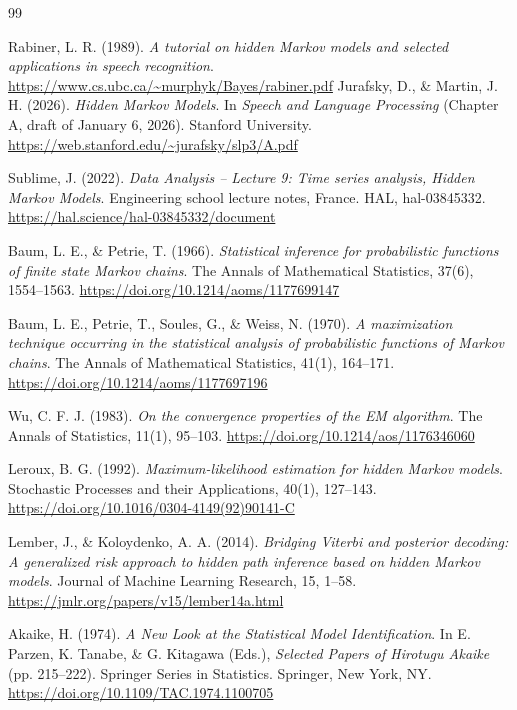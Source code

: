 \documentclass[11pt]{article}
\begin{document}
\begin{thebibliography}{99}

Rabiner, L. R. (1989).
\emph{A tutorial on hidden Markov models and selected applications in speech recognition}.
\url{https://www.cs.ubc.ca/~murphyk/Bayes/rabiner.pdf}
Jurafsky, D., \& Martin, J. H. (2026).
\emph{Hidden Markov Models}.
In \emph{Speech and Language Processing} (Chapter A, draft of January 6, 2026).
Stanford University.
\url{https://web.stanford.edu/~jurafsky/slp3/A.pdf}

Sublime, J. (2022).
\emph{Data Analysis -- Lecture 9: Time series analysis, Hidden Markov Models}.
Engineering school lecture notes, France.
HAL, hal-03845332.
\url{https://hal.science/hal-03845332/document}

Baum, L. E., \& Petrie, T. (1966).
\emph{Statistical inference for probabilistic functions of finite state Markov chains}.
The Annals of Mathematical Statistics, 37(6), 1554--1563.
\url{https://doi.org/10.1214/aoms/1177699147}

Baum, L. E., Petrie, T., Soules, G., \& Weiss, N. (1970).
\emph{A maximization technique occurring in the statistical analysis of probabilistic functions of Markov chains}.
The Annals of Mathematical Statistics, 41(1), 164--171.
\url{https://doi.org/10.1214/aoms/1177697196}


Wu, C. F. J. (1983).
\emph{On the convergence properties of the EM algorithm}.
The Annals of Statistics, 11(1), 95--103.
\url{https://doi.org/10.1214/aos/1176346060}


Leroux, B. G. (1992).
\emph{Maximum-likelihood estimation for hidden Markov models}.
Stochastic Processes and their Applications, 40(1), 127--143.
\url{https://doi.org/10.1016/0304-4149(92)90141-C}


Lember, J., \& Koloydenko, A. A. (2014).
\emph{Bridging Viterbi and posterior decoding: A generalized risk approach to hidden path inference based on hidden Markov models}.
Journal of Machine Learning Research, 15, 1--58.
\url{https://jmlr.org/papers/v15/lember14a.html}

Akaike, H. (1974).
\emph{A New Look at the Statistical Model Identification}.
In E. Parzen, K. Tanabe, \& G. Kitagawa (Eds.),
\emph{Selected Papers of Hirotugu Akaike}
(pp. 215--222).
Springer Series in Statistics. Springer, New York, NY.
\url{https://doi.org/10.1109/TAC.1974.1100705}


\end{thebibliography}
\end{document}
